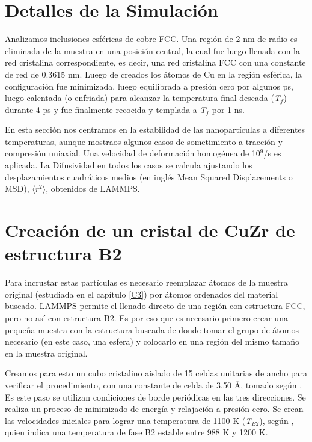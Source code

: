 
\section{Detalles de la Simulación}
\label{S4_1}

Analizamos inclusiones esféricas de cobre FCC. Una región de 2 nm de radio es eliminada de la muestra en una posición central, la cual fue luego llenada con la red cristalina correspondiente, es decir, una red cristalina FCC con una constante de red de 0.3615 nm. Luego de creados los átomos de Cu en la región esférica, la configuración fue minimizada, luego equilibrada a presión cero por algunos ps, luego calentada (o enfriada) para alcanzar la temperatura final deseada (\textit{T$_{f}$}) durante 4 ps y fue finalmente recocida y templada a \textit{T$_{f}$} por 1 ns.

En esta sección nos centramos en la estabilidad de las nanopartículas a diferentes temperaturas, aunque mostraos algunos casos de sometimiento a tracción y compresión uniaxial. Una velocidad de deformación homogénea de 10$^{9}$/s es aplicada. La Difusividad en todos los casos se calcula ajustando los desplazamientos cuadráticos medios (en inglés Mean Squared Displacements o MSD), $\langle r^{2}\rangle$, obtenidos de LAMMPS.

\section{Creación de un cristal de CuZr de estructura B2}
\label{S4_2}

Para incrustar estas partículas es necesario reemplazar átomos de la muestra original (estudiada en el capítulo \ref{C3}) por átomos ordenados del material buscado. LAMMPS permite el llenado directo de una región con estructura FCC, pero no así con estructura B2. Es por eso que es necesario  primero crear una pequeña muestra con la estructura buscada de donde tomar el grupo de átomos necesario (en este caso, una esfera) y colocarlo en una región del mismo tamaño en la muestra original.

Creamos para esto un cubo cristalino aislado de 15 celdas unitarias de ancho para verificar el procedimiento, con una constante de celda de 3.50 \AA{}, tomado según \cite{inoue04}. Es este paso se utilizan condiciones de borde periódicas en las tres direcciones. Se realiza un proceso de minimizado de energía y relajación a presión cero. Se crean las velocidades iniciales para lograr una temperatura de 1100 K (\textit{T$_{B2}$}), según \cite{pauly10}, quien indica una temperatura de fase B2 estable entre 988 K y 1200 K. 

